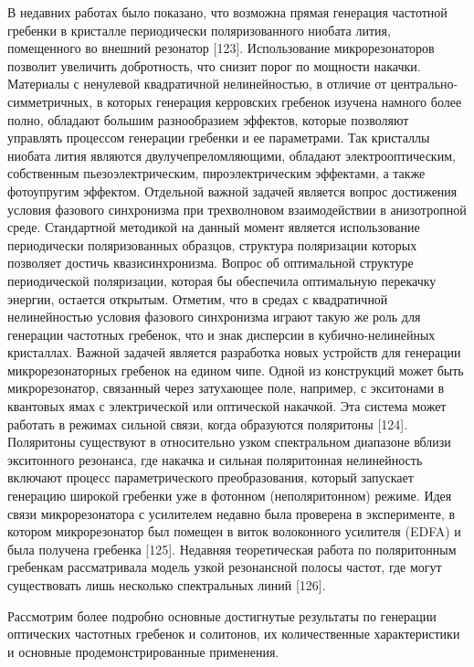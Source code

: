 В недавних работах было показано, что возможна прямая генерация частотной гребенки в кристалле периодически поляризованного ниобата лития, помещенного во внешний резонатор [123]. Использование микрорезонаторов позволит увеличить добротность, что снизит порог по мощности накачки. Материалы с ненулевой квадратичной нелинейностью, в отличие от центрально-симметричных, в которых генерация керровских гребенок изучена намного более полно, обладают большим разнообразием эффектов, которые позволяют управлять процессом генерации гребенки и ее параметрами. Так кристаллы ниобата лития являются двулучепреломляющими, обладают электрооптическим, собственным пьезоэлектрическим, пироэлектрическим эффектами, а также фотоупругим эффектом. Отдельной важной задачей является вопрос достижения условия фазового синхронизма при трехволновом взаимодействии в анизотропной среде. Стандартной методикой на данный момент является использование периодически поляризованных образцов, структура поляризации которых позволяет достичь квазисинхронизма. Вопрос об оптимальной структуре периодической поляризации, которая бы обеспечила оптимальную перекачку энергии, остается открытым. Отметим, что в средах с квадратичной нелинейностью условия фазового синхронизма играют такую же роль для генерации частотных гребенок, что и знак дисперсии в кубично-нелинейных кристаллах.
Важной задачей является разработка новых устройств для генерации микрорезонаторных гребенок на едином чипе. Одной из конструкций может быть микрорезонатор, связанный через затухающее поле, например, с экситонами в квантовых ямах с электрической или оптической накачкой. Эта система может работать в режимах сильной связи, когда образуются поляритоны [124]. Поляритоны существуют в относительно узком спектральном диапазоне вблизи экситонного резонанса, где накачка и сильная поляритонная нелинейность включают процесс параметрического преобразования, который запускает генерацию широкой гребенки уже в фотонном (неполяритонном) режиме. Идея связи микрорезонатора с усилителем недавно была проверена в эксперименте, в котором микрорезонатор был помещен в виток волоконного усилителя (EDFA) и была получена гребенка [125]. Недавняя теоретическая работа по поляритонным гребенкам рассматривала модель узкой резонансной полосы частот, где могут существовать лишь несколько спектральных линий [126].


Рассмотрим более подробно основные достигнутые результаты по генерации оптических частотных гребенок и солитонов, их количественные характеристики и основные продемонстрированные применения.

